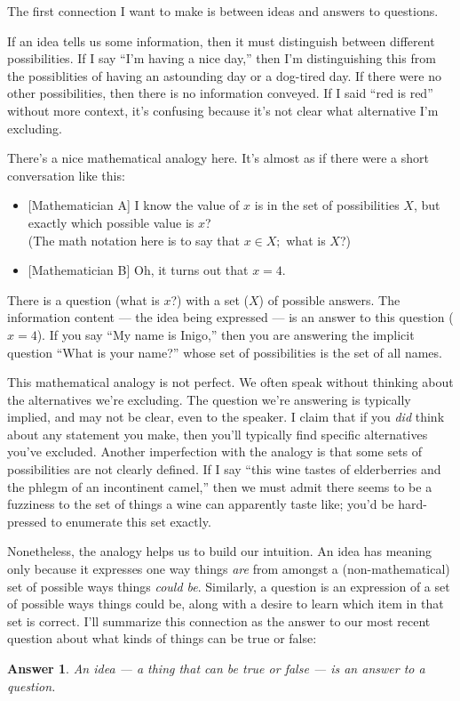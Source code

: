 \documentclass[11pt, oneside]{article}
\newtheorem*{answer}{Answer}
\begin{document}
The first connection I want to make is between ideas and answers to questions.

If an idea tells us some information, then it must distinguish between different
possibilities. If I say ``I'm having a nice day,'' then I'm distinguishing this
from the possiblities of having an astounding day or a dog-tired day.
If there were no other possibilities,
then there is no information conveyed. If I said
``red is red'' without more context,
it's confusing because it's not clear what
alternative I'm excluding.

There's a nice mathematical analogy here. It's almost as if there were a short
conversation like this:
\begin{itemize}
    \item{} [Mathematician A] I know the value of $x$ is in the set of
        possibilities $X$, but exactly which possible value is $x$?\\
        (The math notation here is to say that $x\in X;$ what is $X$?)
    \item{} [Mathematician B] Oh, it turns out that $x=4$.
\end{itemize}
There is a question (what is $x$?) with a set ($X$) of possible answers. The
information content --- the idea being expressed ---
is an answer to this question ($x=4$). If you say ``My name is Inigo,''
then you are answering the implicit question ``What is your name?'' whose set of
possibilities is the set of all names.

This mathematical analogy is not perfect.
We often speak without thinking about the
alternatives we're excluding.
The question we're answering
is typically implied, and may not be clear, even to
the speaker.
I claim that if you {\em did} think about any statement
you
make, then
you'll typically find specific alternatives you've excluded.
Another imperfection with the analogy is that some sets of possibilities are not
clearly defined.
If I say ``this wine tastes of
elderberries and the phlegm of an incontinent camel,'' then we must admit there
seems to be a fuzziness to the set of things a wine can apparently taste like;
you'd be hard-pressed to enumerate this set exactly.

Nonetheless, the analogy helps us to build our intuition.
An idea has meaning only because it expresses one way things
{\em are} from amongst a
(non-mathematical) set of possible ways things {\em could be}.
Similarly, a question is an expression of a set of possible ways things could
be, along with a desire to learn which item in that set is correct.
I'll summarize this
connection as the answer to our most recent question about what
kinds of things can be true or false:
\begin{answer}
An idea --- a thing that can be true or false --- is an answer to a question.
\end{answer}
\end{document}
